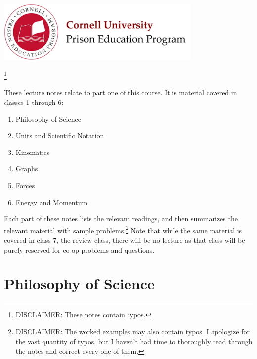 \documentclass[12pt]{article}
\begin{document}
\begin{center}
\includegraphics[width=10cm]{../images/logo.png}
\end{center}

\begin{center}
\footnote{DISCLAIMER: These notes contain typos.}

\vspace{0.1in}
\end{center}

\noindent These lecture notes relate to part one of this course. It is material covered in classes 1 through 6:
\begin{enumerate}
\item Philosophy of Science
\item Units and Scientific Notation
\item Kinematics
\item Graphs
\item Forces
\item Energy and Momentum
\end{enumerate}

\noindent Each part of these notes lists the relevant readings, and then summarizes the relevant material with sample problems.\footnote{DISCLAIMER: The worked examples may also contain typos. I apologize for the vast quantity of typos, but I haven't had time to thoroughly read through the notes and correct every one of them.} Note that while the same material is covered in class 7, the review class, there will be no lecture as that class will be purely reserved for co-op problems and questions.

\section{Philosophy of Science}
\end{document}
